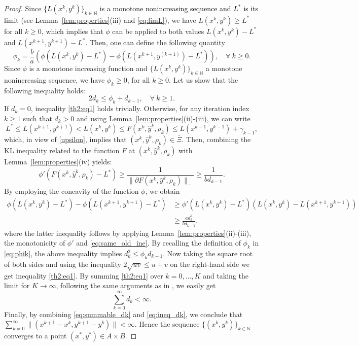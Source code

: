 \documentclass[pdflatex,sn-mathphys-num]{sn-jnl}
\numberwithin{equation}{section}%
\def\N{\mathbb{N}}
\newcommand{\REV}[1]{\textcolor{black}{#1}}
\theoremstyle{thmstyleone}%
\theoremstyle{thmstyletwo}%
\theoremstyle{thmstylethree}%
\begin{document}
\begin{proof}
Since \REV{$\{L(x^k,y^k)\}_{k\in\mathbb{N}}$ is a monotone nonincreasing sequence and $L^*$ is its limit (see Lemma~\ref{lem:properties}(iii) and \eqref{eq:limL}), } we have $L(x^k,y^k)\geq L^*$ for all $k\geq 0$, which implies that $\phi$ can be applied to both values $L(x^k,y^k)-L^*$ and $L(x^{k+1},y^{k+1})-L^*$. Then, one can define the following quantity
\begin{equation}\label{eq:phik}
    \phi_k = \frac{b}{a}(\phi(L(x^k,y^k)-L^*)- \phi(L(x^{k+1},y^{(k+1)})-L^*)), \quad \forall \ k\geq 0.
\end{equation}
Since $\phi$ is a monotone increasing function and $\{L(x^k,y^k)\}_{k\in\mathbb{N}}$ a monotone nonincreasing sequence, we have $\phi_k\geq 0$, for all $k\geq 0$. Let us show that the following inequality holds:
\begin{equation}\label{th2:eq1}
    2d_k\leq \phi_k+d_{k-1}, \quad \forall \ k\geq 1.
\end{equation}
If $d_k=0$, inequality \eqref{th2:eq1} holds trivially. Otherwise, for any iteration index $k\geq 1$ such that $d_k>0$ and using Lemma~\ref{lem:properties}(ii)-(iii), we can write
\begin{equation*}
    L^*\leq L(x^{k+1},y^{k+1})< L(x^k,y^k)\leq F(x^k,\hat{y}^k,\rho_k) \leq L(x^{k-1},{y}^{k-1}) + \gamma_{k-1},
\end{equation*}
which, in view of \eqref{upsilon}, implies that $(x^{k},\hat{y}^{k},\rho_k)\in \bar \Xi$.
Then, combining the KL inequality related to the function $F$ at $(x^{k},\hat{y}^{k},\rho_k)$ with Lemma~\ref{lem:properties}(iv) yields:
\begin{equation}\label{eq:same_old_ine}   \phi'(F(x^{k},\hat{y}^{k},\rho_k)-L^*)\geq \frac{1}{\|\partial F(x^{k},\hat{y}^{k},\rho_k)\|_-}\geq \frac{1}{b d_{k-1}}.
\end{equation}
By employing the concavity of the function $\phi$, we obtain
\begin{align*}
\phi(L(x^k,y^k)-L^*)-\phi(L(x^{k+1},y^{k+1})-L^*)&\geq \phi'(L(x^k,y^k)-L^*)(L(x^k,y^k)-L(x^{k+1},y^{k+1})) \\ 
&\geq  \frac{ad_k^2}{bd_{k-1}},
\end{align*}
{where the latter inequality follows by applying Lemma~\ref{lem:properties}(ii)-(iii), the monotonicity of $\phi'$ and \eqref{eq:same_old_ine}.} 
By recalling the definition of $\phi_k$ in \eqref{eq:phik}, the above inequality implies $d_k^2\leq \phi_kd_{k-1}$.
Now taking the square root of both sides and using the inequality $2\sqrt{uv}\leq u+v$ on the right-hand side we get inequality \eqref{th2:eq1}. By summing \eqref{th2:eq1} over $k=0,\ldots,K$ and taking the limit for $K\rightarrow \infty$, following the same arguments as in \cite[Theorem 5]{Bonettini-Ochs-Prato-Rebegoldi-2023}, we easily get
\begin{equation}\label{eq:summable_dk}
    \sum_{k=0}^{\infty}d_k < \infty.
\end{equation} 
Finally, by combining \eqref{eq:summable_dk} and \eqref{eq:ineq_dk}, we conclude that $
\sum_{k=0}^{\infty}\|(x^{k+1}-x^k,y^{k+1}-y^k)\|<\infty$. Hence the sequence $\{(x^k,y^k)\}_{k\in\N}$ converges to a point $(x^*,y^*)\in A\times B$.


\end{proof}
\end{document}
